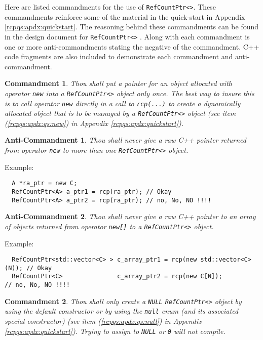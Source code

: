 \documentclass[pdf,ps2pdf,11pt]{SANDreport}
\newtheorem{commandment}{Commandment}
\newtheorem{anticommandment}{Anti-Commandment}
\begin{document}
Here are listed commandments for the use of
{}\texttt{Ref\-Count\-Ptr<>}.  These commandments reinforce some of
the material in the quick-start in Appendix
{}\ref{rcpqs:apdx:quickstart}.  The reasoning behind these
commandments can be found in the design document for
{}\texttt{Ref\-Count\-Ptr<>} {}\cite{ref:RefCountPtr}.  Along with
each commandment is one or more anti-commandments stating the negative
of the commandment.  C++ code fragments are also included to
demonstrate each commandment and anti-commandment.

\begin{commandment}\label{rcp:cmd:rcp-new}
Thou shall put a pointer for an object allocated with operator
{}\texttt{new} into a {}\texttt{Ref\-Count\-Ptr<>} object only once.
The best way to insure this is to call operator {}\texttt{new}
directly in a call to {}\texttt{rcp(...)} to create a dynamically
allocated object that is to be managed by a
{}\texttt{Ref\-Count\-Ptr<>} object (see item
({}\ref{rcpqs:apdx:qs:new}) in Appendix
{}\ref{rcpqs:apdx:quickstart}).
\end{commandment}

\begin{anticommandment}
Thou shall never give a raw C++ pointer returned from operator
{}\texttt{new} to more than one {}\texttt{Ref\-Count\-Ptr<>} object.
\end{anticommandment}

{}\noindent{}Example:
{\small\begin{verbatim}
  A *ra_ptr = new C;
  RefCountPtr<A> a_ptr1 = rcp(ra_ptr); // Okay
  RefCountPtr<A> a_ptr2 = rcp(ra_ptr); // no, No, NO !!!!
\end{verbatim}}

\begin{anticommandment}
Thou shall never give a raw C++ pointer to an array of objects
returned from operator {}\texttt{new[]} to a
{}\texttt{Ref\-Count\-Ptr<>} object.
\end{anticommandment}

{}\noindent{}Example:
{\small\begin{verbatim}
  RefCountPtr<std::vector<C> > c_array_ptr1 = rcp(new std::vector<C>(N)); // Okay
  RefCountPtr<C>               c_array_ptr2 = rcp(new C[N]);              // no, No, NO !!!!
\end{verbatim}}

\begin{commandment}
Thou shall only create a {}\texttt{NULL} {}\texttt{Ref\-Count\-Ptr<>}
object by using the default constructor or by using the
{}\texttt{null} enum (and its associated special constructor) (see
item ({}\ref{rcpqs:apdx:qs:null}) in Appendix
{}\ref{rcpqs:apdx:quickstart}).  Trying to assign to {}\texttt{NULL}
or {}\texttt{0} will not compile.
\end{commandment}
\end{document}
